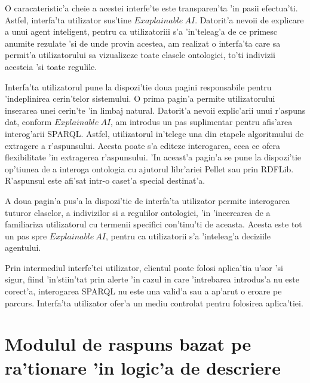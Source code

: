 \documentclass[12pt,a4paper,twoside]{report}
\begin{document}
O caracateristic'a cheie a acestei interfe'te este transparen'ta 'in pasii efectua'ti. Astfel, interfa'ta utilizator sus'tine $Exaplainable\ AI$. Datorit'a nevoii de explicare a unui agent inteligent, pentru ca utilizatoriii s'a 'in'teleag'a de ce primesc anumite rezulate 'si de unde provin acestea, am realizat o interfa'ta care sa permit'a utilizatorului sa vizualizeze toate clasele ontologiei, to'ti indivizii acesteia 'si toate regulile.

Interfa'ta utilizatorul pune la dispozi'tie doua pagini responsabile pentru 'indeplinirea cerin'telor sistemului. O prima pagin'a permite utilizatorului inserarea unei cerin'te 'in limbaj natural. Datorit'a nevoii explic'arii unui r'aspuns dat, conform $Explainable\ AI$, am introdus un pas suplimentar pentru afis'area interog'arii SPARQL. Astfel, utilizatorul in'telege una din etapele algoritmului de extragere a r'aspunsului. Acesta poate s'a editeze interogarea, ceea ce ofera flexibilitate 'in extragerea r'aspunsului. 'In aceast'a pagin'a se pune la dispozi'tie op'tiunea de a interoga ontologia cu ajutorul libr'ariei Pellet sau prin RDFLib. R'aspunsul este afi'sat intr-o caset'a special destinat'a.

A doua pagin'a pus'a la dispozi'tie de interfa'ta utilizator permite interogarea tuturor claselor, a indivizilor si a regulilor ontologiei, 'in 'incercarea de a familiariza utilizatorul cu termenii specifici con'tinu'ti de aceasta. Acesta este tot un pas spre $Explainable\ AI$, pentru ca utilizatorii s'a 'inteleag'a deciziile agentului.

Prin intermediul interfe'tei utilizator, clientul poate folosi aplica'tia u'sor 'si sigur, fiind 'in'stiin'tat prin alerte 'in cazul in care 'intrebarea introdus'a nu este corect'a, interogarea SPARQL nu este una valid'a sau a ap'arut o eroare pe parcurs. Interfa'ta utilizator ofer'a un mediu controlat pentru folosirea aplica'tiei.

\section{Modulul de raspuns bazat pe ra'tionare 'in logic'a de descriere}
\end{document}
